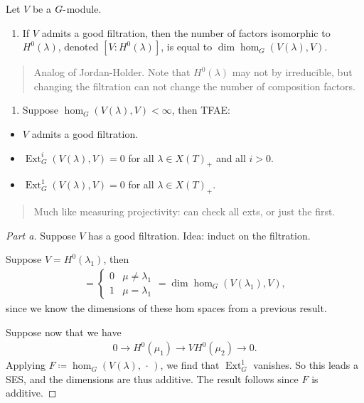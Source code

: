 \begin{theorem}

Let \(V\) be a \(G{\hbox{-}}\)module.

\begin{enumerate}
\def\labelenumi{\arabic{enumi}.}
\tightlist
\item
  If \(V\) admits a good filtration, then the number of factors
  isomorphic to \(H^0(\lambda)\), denoted \([V: H^0(\lambda)]\), is
  equal to \(\dim \hom_G(V(\lambda), V)\).
\end{enumerate}

\begin{quote}
Analog of Jordan-Holder. Note that \(H^0(\lambda)\) may not by
irreducible, but changing the filtration can not change the number of
composition factors.
\end{quote}

\begin{enumerate}
\def\labelenumi{\arabic{enumi}.}
\setcounter{enumi}{1}
\tightlist
\item
  Suppose \(\hom_G(V(\lambda), V)<\infty\), then TFAE:
\end{enumerate}

\begin{itemize}
\tightlist
\item
  \(V\) admits a good filtration.
\item
  \(\operatorname{Ext}^i_G(V(\lambda), V) = 0\) for all
  \(\lambda \in X(T)_+\) and all \(i>0\).
\item
  \(\operatorname{Ext}^1_G(V(\lambda), V) = 0\) for all
  \(\lambda \in X(T)_+\).
\end{itemize}

\begin{quote}
Much like measuring projectivity: can check all exts, or just the first.
\end{quote}

\end{theorem}

\begin{proof}[Part a]

Suppose \(V\) has a good filtration. Idea: induct on the filtration.

Suppose \(V = H^0(\lambda_1)\), then
\begin{align*}  
[V: H^0(\mu) ] = 
\begin{cases}
0 & \mu \neq \lambda_1 \\
1 & \mu = \lambda_1
\end{cases}
= \dim \hom_G(V(\lambda_1), V)
,\end{align*}
since we know the dimensions of these hom spaces from a previous result.

Suppose now that we have
\begin{align*}  
0 \to H^0(\mu_1) \to V H^0(\mu_2) \to 0
.\end{align*}
Applying \(F \coloneqq\hom_G(V(\lambda), {\,\cdot\,})\), we find that
\(\operatorname{Ext}^1_G\) vanishes. So this leads a SES, and the
dimensions are thus additive. The result follows since \(F\) is
additive.

\end{proof}

